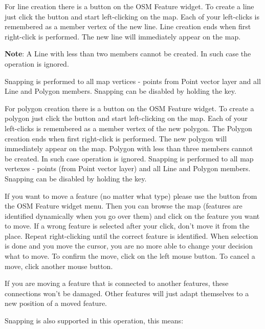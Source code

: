 
For line creation there is a  button 
on the OSM Feature widget. To create a line just click the button and start 
left-clicking on the map. Each of your left-clicks is remembered as a member 
vertex of the new line. Line creation ends when first right-click is performed. 
The new line will immediately appear on the map.

\textbf{Note}: A Line with less than two members cannot be created. In 
such case the operation is ignored.

Snapping is performed to all map vertices - points from Point vector layer
and all Line and Polygon members. Snapping can be disabled by holding the 
 key.


For polygon creation there is a  
button on the OSM Feature widget. To create a polygon just click the button 
and start left-clicking on the map. Each of your left-clicks is remembered as 
a member vertex of the new polygon. The Polygon creation ends when first 
right-click is performed. The new polygon will immediately appear on the map.
Polygon with less than three members cannot be created. In such case
operation is ignored. Snapping is performed to all map vertexes - points 
(from Point vector layer) and all Line and Polygon members. Snapping can be 
disabled by holding the  key.


If you want to move a feature (no matter what type) please use the
 button from the OSM Feature widget menu. 
Then you can browse the map (features are identified dynamically when you 
go over them) and click on the feature you want to move. If a wrong feature is
selected after your click, don't move it from the place. Repeat right-clicking
until the correct feature is identified. When selection is done and you move
the cursor, you are no more able to change your decision what to move.
To confirm the move, click on the left mouse button. To cancel a move, click 
another mouse button.

If you are moving a feature that is connected to another features, these
connections won't be damaged. Other features will just adapt themselves to
a new position of a moved feature. 

Snapping is also supported in this operation, this means: 

